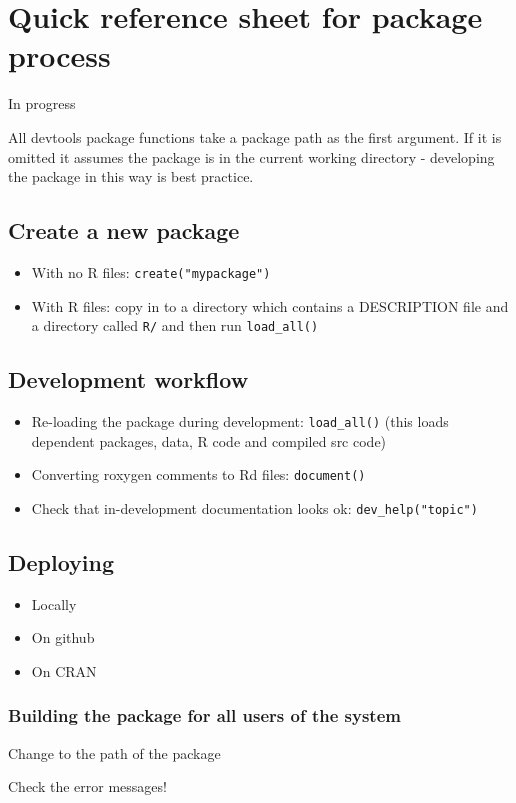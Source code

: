 \chapter{Quick reference sheet for package process}

In progress

All devtools package functions take a package path as the first
argument. If it is omitted it assumes the package is in the current
working directory - developing the package in this way is best practice.

\section{Create a new package}

\begin{itemize}
\item
  With no R files: \texttt{create("mypackage")}
\item
  With R files: copy in to a directory which contains a DESCRIPTION file
  and a directory called \texttt{R/} and then run \texttt{load\_all()}
\end{itemize}

\section{Development workflow}

\begin{itemize}
\item
  Re-loading the package during development: \texttt{load\_all()} (this
  loads dependent packages, data, R code and compiled src code)
\item
  Converting roxygen comments to Rd files: \texttt{document()}
\item
  Check that in-development documentation looks ok:
  \texttt{dev\_help("topic")}
\end{itemize}

\section{Deploying}

\begin{itemize}
\itemsep1pt\parskip0pt
\item
  Locally
\item
  On github
\item
  On CRAN
\end{itemize}

\subsection{Building the package for all users of the system}

Change to the path of the package

\begin{Shaded}
\begin{Highlighting}[]
\NormalTok{()}
\NormalTok{()}
\end{Highlighting}
\end{Shaded}

Check the error messages!
